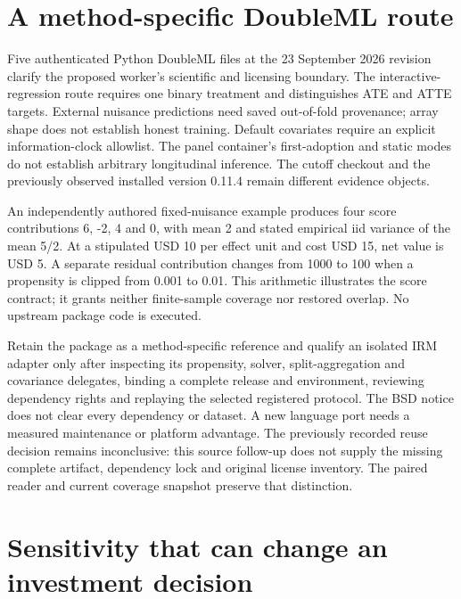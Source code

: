 \hypertarget{a-method-specific-doubleml-route}{%
\section{A method-specific DoubleML
route}\label{a-method-specific-doubleml-route}}

Five authenticated Python DoubleML files at the 23 September 2026
revision clarify the proposed worker's scientific and licensing
boundary. The interactive-regression route requires one binary treatment
and distinguishes ATE and ATTE targets. External nuisance predictions
need saved out-of-fold provenance; array shape does not establish honest
training. Default covariates require an explicit information-clock
allowlist. The panel container's first-adoption and static modes do not
establish arbitrary longitudinal inference. The cutoff checkout and the
previously observed installed version 0.11.4 remain different evidence
objects. \citep{exec23_doubleml_reuse_source}

An independently authored fixed-nuisance example produces four score
contributions 6, -2, 4 and 0, with mean 2 and stated empirical iid
variance of the mean 5/2. At a stipulated USD 10 per effect unit and
cost USD 15, net value is USD 5. A separate residual contribution
changes from 1000 to 100 when a propensity is clipped from 0.001 to
0.01. This arithmetic illustrates the score contract; it grants neither
finite-sample coverage nor restored overlap. No upstream package code is
executed. \citep{exec23_doubleml_reuse_reference}

Retain the package as a method-specific reference and qualify an
isolated IRM adapter only after inspecting its propensity, solver,
split-aggregation and covariance delegates, binding a complete release
and environment, reviewing dependency rights and replaying the selected
registered protocol. The BSD notice does not clear every dependency or
dataset. A new language port needs a measured maintenance or platform
advantage. The previously recorded reuse decision remains inconclusive:
this source follow-up does not supply the missing complete artifact,
dependency lock and original license inventory. The paired reader and
current coverage snapshot preserve that distinction.
\citep{exec23_doubleml_reuse_source,sp23doubleml_reader,sp23doubleml_progress}

\hypertarget{sensitivity-that-can-change-an-investment-decision}{%
\section{Sensitivity that can change an investment
decision}\label{sensitivity-that-can-change-an-investment-decision}}

